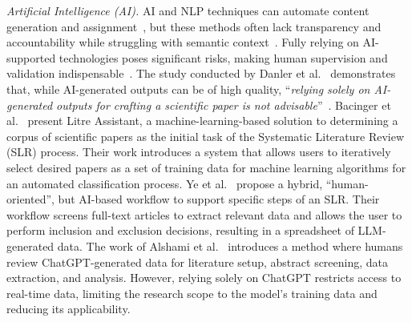 \documentclass[runningheads]{llncs}
\begin{document}
\noindent
\textit{Artificial Intelligence (AI).}
AI and NLP techniques can automate content generation and assignment~\cite{dessi_generating_2021}, but these methods often lack transparency and accountability while struggling with semantic context~\cite{khalid_explainable_2022}.
Fully relying on AI-supported technologies poses significant risks, making human supervision and validation indispensable~\cite{ren_human-machine_2023}.
% 
The study conducted by Danler et al.~\cite{danler_quality_2024} demonstrates that, while AI-generated outputs can be of high quality, ``\textit{relying solely on AI-generated outputs for crafting a scientific paper is not advisable}''~\cite[p.~207]{danler_quality_2024}.
%
Bacinger et al.~\cite{bacinger_system_2022} present Litre Assistant, a machine-learning-based solution to determining a corpus of scientific papers as the initial task of the Systematic Literature Review (SLR) process.
Their work introduces a system that allows users to iteratively select desired papers as a set of training data for machine learning algorithms for an automated classification process.
% 
Ye et al.~\cite{ye_hybrid_2024} propose a hybrid, ``human-oriented'', but AI-based workflow to support specific steps of an SLR.
Their workflow screens full-text articles to extract relevant data and allows the user to perform inclusion and exclusion decisions, resulting in a spreadsheet of LLM-generated data.
% 
The work of Alshami et al.~\cite{alshami_harnessing_2023} introduces a method where humans review ChatGPT-generated data for literature setup, abstract screening, data extraction, and analysis. However, relying solely on ChatGPT restricts access to real-time data, limiting the research scope to the model's training data and reducing its applicability.\vspace{0.1cm}
\end{document}
